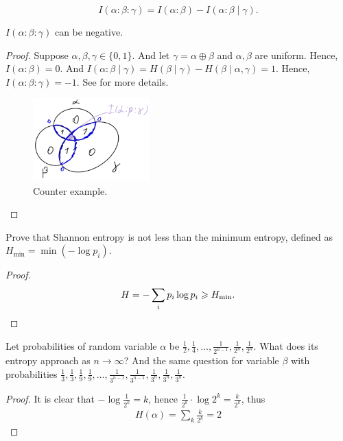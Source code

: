 \begin{definition}
    \[
        I(\alpha : \beta : \gamma) = I(\alpha : \beta) - I(\alpha : \beta \mid \gamma).
    \]
\end{definition}
\begin{lemma}
    $I(\alpha : \beta : \gamma)$ can be negative.
\end{lemma}
\begin{proof}
    Suppose $\alpha, \beta, \gamma \in \{0, 1\}$.
    And let $\gamma = \alpha \oplus \beta$ and $\alpha, \beta$ are uniform.
    Hence, $I(\alpha \colon \beta) = 0$.
    And  $I(\alpha : \beta \mid \gamma) = H(\beta \mid \gamma) - H(\beta \mid \alpha, \gamma) = 1$.
    Hence,  $I(\alpha : \beta : \gamma) = -1$.
    See  for more details.
    \begin{figure}[H]
        \centering
        \includegraphics[width=0.4\textwidth]{figures/33E03ECB-3AAA-4EF8-98AF-42039AB45307}
        \caption{Counter example.}
        \label{fig:33e03ecb-3aaa-4ef8-98af-42039ab45307}
    \end{figure}

\end{proof}



\begin{exercise}
    Prove that Shannon entropy is not less than the minimum entropy, defined as $H_{\min} = \min (- \log p_i)$.
\end{exercise}
\begin{proof}
    \[
        H = -\sum_i p_i \log p_i \geq H_{\min}. \qedhere
    \]
\end{proof}

\begin{exercise}
    Let probabilities of random variable $\alpha$ be $\frac{1}{2}, \frac{1}{4}, \ldots, \frac{1}{2^{n - 1}}, \frac{1}{2^{n}}, \frac{1}{2^{n}}$.
    What does its entropy approach as $n \to \infty$?
    And the same question for variable $\beta$  with probabilities $\frac{1}{3}, \frac{1}{3}, \frac{1}{9}, \frac{1}{9}, \dots, \frac{1}{3^{n - 1}}, \frac{1}{3^{n - 1}}, \frac{1}{3^{n}}, \frac{1}{3^{n}}, \frac{1}{3^{n}}$.
\end{exercise}
\begin{proof}
    It is clear that $-\log \frac{1}{2^{k}} = k$, hence $\frac{1}{2^{k}} \cdot \log 2^{k} = \frac{k}{2^{k}}$, thus
    \begin{align*}
        H(\alpha) = \sum_k \frac{k}{2^{k}} = 2
    \end{align*}

\end{proof}
